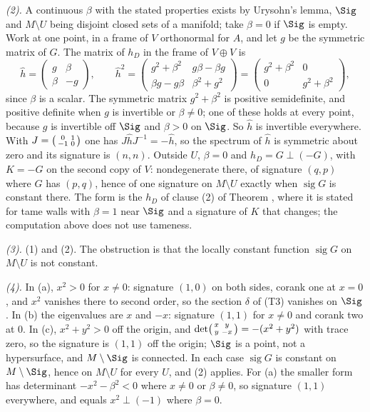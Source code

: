 \emph{(2).} A continuous $\beta$ with the stated properties exists by Urysohn's lemma, $\Sig$ and $M \setminus U$ being disjoint closed sets of a manifold; take $\beta = 0$ if $\Sig$ is empty. Work at one point, in a frame of $V$ orthonormal for $A$, and let $g$ be the symmetric matrix of $G$. The matrix of $h_{D}$ in the frame of $V \oplus V$ is
\[
\hat h = \begin{pmatrix} g & \beta \\ \beta & -g \end{pmatrix},
\qquad
\hat h^{2} = \begin{pmatrix} g^{2} + \beta^{2} & g\beta - \beta g \\ \beta g - g\beta & \beta^{2} + g^{2} \end{pmatrix}
= \begin{pmatrix} g^{2} + \beta^{2} & 0 \\ 0 & g^{2} + \beta^{2} \end{pmatrix},
\]
since $\beta$ is a scalar. The symmetric matrix $g^{2} + \beta^{2}$ is positive semidefinite, and positive definite when $g$ is invertible or $\beta \neq 0$; one of these holds at every point, because $g$ is invertible off $\Sig$ and $\beta > 0$ on $\Sig$. So $\hat h$ is invertible everywhere. With $J = \begin{psmallmatrix} 0 & 1 \\ -1 & 0\end{psmallmatrix}$ one has $J\hat h J^{-1} = -\hat h$, so the spectrum of $\hat h$ is symmetric about zero and its signature is $(n,n)$. Outside $U$, $\beta = 0$ and $h_{D} = G \perp (-G)$, with $K = -G$ on the second copy of $V$: nondegenerate there, of signature $(q,p)$ where $G$ has $(p,q)$, hence of one signature on $M \setminus U$ exactly when $\operatorname{sig} G$ is constant there. The form is the $h_{D}$ of clause (2) of Theorem , where it is stated for tame walls with $\beta = 1$ near $\Sig$ and a signature of $K$ that changes; the computation above does not use tameness.

\emph{(3).} (1) and (2). The obstruction is that the locally constant function $\operatorname{sig} G$ on $M \setminus U$ is not constant.

\emph{(4).} In (a), $x^{2} > 0$ for $x \neq 0$: signature $(1,0)$ on both sides, corank one at $x = 0$, and $x^{2}$ vanishes there to second order, so the section $\delta$ of (T3) vanishes on $\Sig$. In (b) the eigenvalues are $x$ and $-x$: signature $(1,1)$ for $x \neq 0$ and corank two at $0$. In (c), $x^{2} + y^{2} > 0$ off the origin, and $\det\begin{psmallmatrix} x & y \\ y & -x\end{psmallmatrix} = -(x^{2} + y^{2})$ with trace zero, so the signature is $(1,1)$ off the origin; $\Sig$ is a point, not a hypersurface, and $M \setminus \Sig$ is connected. In each case $\operatorname{sig} G$ is constant on $M \setminus \Sig$, hence on $M \setminus U$ for every $U$, and (2) applies. For (a) the smaller form has determinant $-x^{2} - \beta^{2} < 0$ where $x \neq 0$ or $\beta \neq 0$, so signature $(1,1)$ everywhere, and equals $x^{2} \perp (-1)$ where $\beta = 0$.

